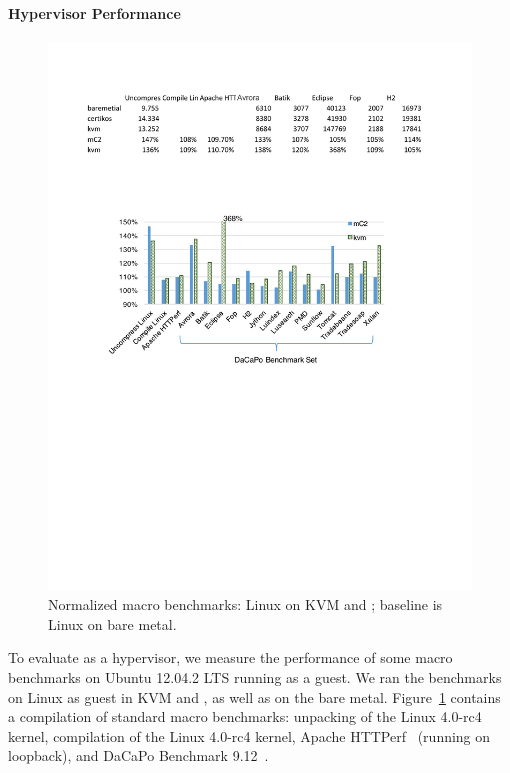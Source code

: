 \paragraph{Hypervisor Performance} 
\begin{figure}\centering
		\includegraphics[width=12cm]{figs/hyp_macro.pdf}
		\caption{Normalized macro benchmarks: Linux on KVM and \mCTOShyper{}; baseline is Linux on bare metal.}
		\label{fig:eval_macro}
		\hrulefill
\end{figure}

To evaluate \mCTOShyper{} as a hypervisor, we measure the performance of
some macro benchmarks on Ubuntu 12.04.2 LTS running as a guest.  We ran the
benchmarks on Linux as guest in KVM and \mCTOShyper{}, as well as on the bare metal.
Figure~\ref{fig:eval_macro} contains a compilation of standard macro
benchmarks: unpacking of the Linux 4.0-rc4 kernel, compilation of the
Linux 4.0-rc4 kernel, Apache HTTPerf~\cite{mosberger1998} (running on
loopback), and DaCaPo Benchmark 9.12~\cite{dacapo2006}.


